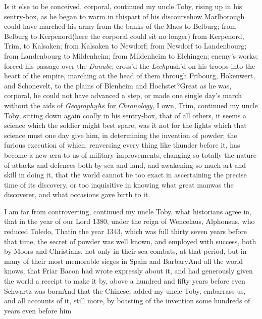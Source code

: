 \documentclass{article}
\begin{document}
Is it else to be conceived, corporal, continued my uncle
Toby, rising up in his sentry-box, as he began to warm in
this\pb part of his discourse\tsk how Marlborough could have
marched his army from the banks of the Maes to
Belburg; from Belburg to Kerpenord\tsk (here the
corporal could sit no longer) from Kerpenord, Trim, to
Kalsaken; from Kalsaken to Newdorf; from
Newdorf to Landenbourg; from Landenbourg to
Mildenheim; from Mildenheim to Elchingen; 
enemy’s works; forced his passage over the \textit{Danube}; cross’d the
\textit{Lech}\tsk push’d on his troops into the heart of the empire, marching at the
head of them through Fribourg, Hokenwert, and Schonevelt, to the plains of Blenheim
and Hochstet?\break\null\tsh Great as he was, corporal, he could\pb 
not have advanced a step, or made one single day’s march without the aids of\break
\textit{Geography}\tsh As for \textit{Chronology}, I own, Trim, continued my uncle
Toby, sitting down again coolly in his sentry-box, that of all others, it seems a
science which the soldier might best spare, was it not for the lights which that
science must one day give him, in determining the invention of powder; the furious
execution of which, renversing every thing like thunder before it, has become a new
æra to us of military improvements, changing so totally the nature of attacks and
defences both by sea and land, and awakening so much art and skill in doing it, that
the world cannot be too exact in ascertaining the precise time of its discovery, or
too inquisitive in knowing what great man\pb was the discoverer, and what occasions
gave birth to it.

I am far from controverting, conti\-nued my uncle Toby,
what historians agree in, that in the year of our Lord 1380, under
the reign of Wencelaus, 
Alphonsus, who reduced Toledo, That\pb in the year
1343, which was full thirty seven years before that time, the secret of powder was
well known, and employed with success, both by Moors and Christians, not only in
their sea-combats, at that period, but in many of their most memorable sieges in
Spain and Barbary\tsk\break And all the world knows, that Friar Bacon had wrote expressly
about it, and had generously given the world a receipt to make it by, above a
hundred and fifty years before even Schwartz was born\tsk And that the Chinese,
added my uncle Toby, embarrass us, and all accounts of it, still more, by boasting
of the invention some hundreds of years even before him\tsh
\end{document}
